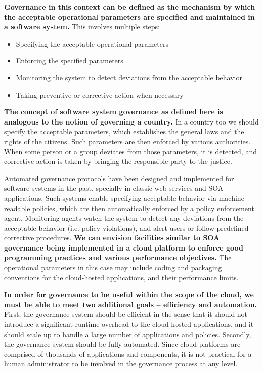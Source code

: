 \textbf{Governance in this context can be defined as the mechanism by which the acceptable 
operational parameters are specified and maintained in a software system.} This involves 
multiple steps:
\begin{itemize}
\item Specifying the acceptable operational parameters
\item Enforcing the specified parameters
\item Monitoring the system to detect deviations from the acceptable behavior
\item Taking preventive or corrective action when necessary
\end{itemize}

\textbf{The concept of software system governance as defined here is analogous to the
notion of governing a country.} In a country too we should specify the acceptable
parameters, which establishes the general laws and the rights of the citizens. Such 
parameters are then
enforced by various authorities. When some person or a group deviates from those parameters,
it is detected, and corrective action is taken by bringing the responsible party to the justice.

Automated governance protocols have been designed and implemented for software systems in
the past, specially in classic web services and SOA applications. Such systems enable specifying
acceptable behavior via machine readable policies, which are then automatically enforced by
a policy enforcement agent. Monitoring agents watch the system to detect any deviations from
the acceptable behavior (i.e. policy violations), and alert users or follow predefined corrective
procedures. \textbf{We can envision facilities similar to SOA governance being implemented in a cloud platform to 
enforce good programming practices and various performance objectives.} The operational
parameters in this case may include coding and packaging conventions for the cloud-hosted
applications, and their performance limits.

\textbf{In order for governance to be
useful within the scope of the cloud, we must be able to meet two additional
goals -- efficiency and automation.} First, the governance system should be 
efficient in the sense that it should not introduce
a significant runtime overhead to the cloud-hosted applications, and it should scale up to
handle a large number of applications and policies. Secondly, the governance system should be
fully automated. Since cloud platforms are comprised of thousands of applications and components,
it is not practical for a human administrator to be involved in the governance process at any level.

